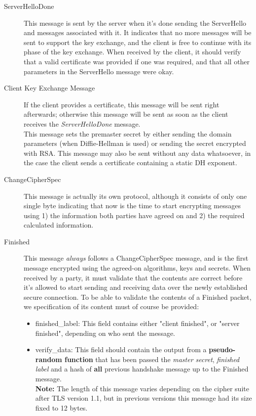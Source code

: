 \begin{description}
	\item[ServerHelloDone]\cite{rfcServerHelloDone,rfcSSLServerHelloDone} This message is sent by the server when it's done sending the ServerHello and messages associated with it. It indicates that no more messages will be sent to support the key exchange, and the client is free to continue with its phase of the key exchange. When received by the client, it should verify that a valid certificate was provided if one was required, and that all other parameters in the ServerHello message were okay.
	
	\item[Client Key Exchange Message]\cite{rfcClientKeyExchange,rfcSSLClientKeyExchange} If the client provides a certificate, this message will be sent right afterwards; otherwise this message will be sent as soon as the client receives the \textit{ServerHelloDone} message. \\This message sets the premaster secret by either sending the domain parameters (when Diffie-Hellman is used) or sending the secret encrypted with RSA. This message may also be sent without any data whatsoever, in the case the client sends a certificate containing a static DH exponent.
	
	\item[ChangeCipherSpec]\cite{rfcChangeCipherSpecProtocol,rfcSSLChangeCipherSpecProtocol} This message is actually its own protocol, although it consists of only one single byte indicating that now is the time to start encrypting messages using 1) the information both parties have agreed on and 2) the required calculated information.
	
	\item[Finished]\cite{rfcFinished,rfcSSLFinished} This message \textit{always} follows a ChangeCipherSpec message, and is the first message encrypted using the agreed-on algorithms, keys and secrets. When received by a party, it must validate that the contents are correct before it's allowed to start sending and receiving data over the newly established secure connection. To be able to validate the contents of a Finished packet, we specification of its content must of course be provided:
	\begin{itemize}
		\item finished\_label: This field contains either "client finished", or "server finished", depending on who sent the message.

		\item verify\_data: This field should contain the output from a \textbf{pseudo-random function} that has been passed the \textit{master secret}, \textit{finished label} and a hash of \textbf{all} previous handshake message up to the Finished message. \\\textbf{Note:} The length of this message varies depending on the cipher suite after TLS version 1.1, but in previous versions this message had its size fixed to 12 bytes.
	\end{itemize}
	 
\end{description}

